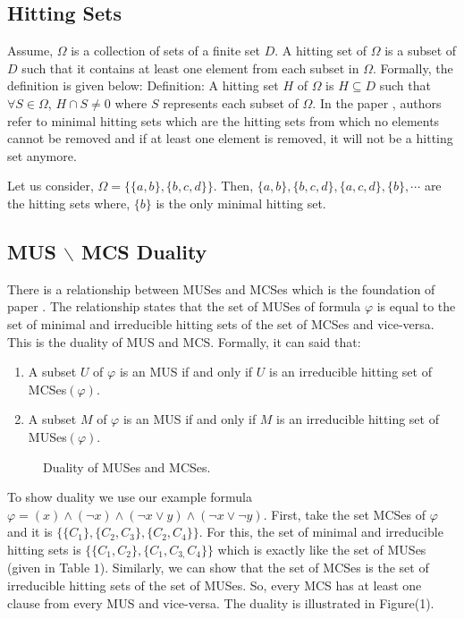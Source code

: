 \subsection{Hitting Sets}
Assume, $\Omega$ is a collection of sets of a finite set $D$. A hitting set of $\Omega$ is a subset of $D$ such that it contains at least one element from each subset in $\Omega$. Formally, the definition is given below:\newline
Definition: A hitting set $H$ of $\Omega$ is $H\subseteq D$ such that $\forall S\in \Omega$, $H\cap S\neq 0$ where $S$ represents each subset of $\Omega$.\newline
In the paper \cite{karem}, authors refer to minimal hitting sets which are the hitting sets from which no elements cannot be removed and if at least one element is removed, it will not be a hitting set anymore.\newline
\begin{example}
Let us consider, $\Omega=\{\{a, b\}, \{b, c, d\}\}$. Then, $\{a,b\}, \{b,c,d\}, \{a,c,d\}, \{b\},\cdots$ are the hitting sets where, $\{b\}$ is the only minimal hitting set.	
\end{example}
\subsection{MUS $\backslash$ MCS Duality}
There is a relationship between MUSes and MCSes which is the foundation of paper \cite{karem}. The relationship states that the set of MUSes of formula $\varphi$ is equal to the set of minimal and irreducible hitting sets of the set of MCSes and vice-versa. This is the duality of MUS and MCS. Formally, it can said that:
\begin{enumerate}
	\item A subset $U$ of $\varphi$ is an MUS if and only if $U$ is an irreducible hitting set of MCSes$(\varphi)$.
	\item A subset $M$ of $\varphi$ is an MUS if and only if $M$ is an irreducible hitting set of MUSes$(\varphi)$.
\end{enumerate}
\begin{figure}[htb] %
	\begin{center}
		
	\end{center}
	\caption{Duality of MUSes and MCSes.}
	\label{fig:graph}
\end{figure}
To show duality we use our example formula $\varphi=(x)\wedge(\neg x)\wedge(\neg x\vee y)\wedge(\neg x \vee \neg y)$. First, take the set MCSes of $\varphi$ and it is $\{\{C_{1}\}, \{C_{2}, C_{3}\}, \{C_{2}, C_{4}\}\}$. For this, the set of minimal and irreducible hitting sets is $\{\{C_{1}, C_{2}\}, \{C_{1}, C_{3,} C_{4}\}\}$ which is exactly like the set of MUSes (given in Table $1$). Similarly, we can show that the set of MCSes is the set of irreducible hitting sets of the set of MUSes. So, every MCS has at least one clause from every MUS and vice-versa. The duality is illustrated in Figure(1).

